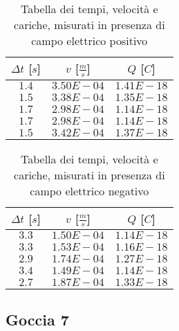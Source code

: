 \documentclass{article}
\begin{document}
\begin{multicols}{2}

\begin{table}[H]
	\centering
	\begin{tabular}{| c | c | c |}
		\hline
		$\Delta t$ [$s$] & $v$ [$\frac ms$] & $Q$ [$C$] \\
		\hline
		$1.4$ & $3.50E-04$ & $1.41E-18$ \\
		$1.5$ & $3.38E-04$ & $1.35E-18$ \\
		$1.7$ & $2.98E-04$ & $1.14E-18$ \\
		$1.7$ & $2.98E-04$ & $1.14E-18$ \\
		$1.5$ & $3.42E-04$ & $1.37E-18$ \\
		\hline
	\end{tabular}
	\caption{Tabella dei tempi, velocità e cariche, misurati in presenza di campo elettrico positivo}
	\label{}
\end{table}

\columnbreak

\begin{table}[H]
	\centering
	\begin{tabular}{| c | c | c |}
		\hline
		$\Delta t$ [$s$] & $v$ [$\frac ms$] & $Q$ [$C$] \\
		\hline
		$3.3$ & $1.50E-04$ & $1.14E-18$ \\
		$3.3$ & $1.53E-04$ & $1.16E-18$ \\
		$2.9$ & $1.74E-04$ & $1.27E-18$ \\
		$3.4$ & $1.49E-04$ & $1.14E-18$ \\
		$2.7$ & $1.87E-04$ & $1.33E-18$ \\
		\hline		
	\end{tabular}
	\caption{Tabella dei tempi, velocità e cariche, misurati in presenza di campo elettrico negativo}
	\label{}
\end{table}
	
\end{multicols}

\subsection{Goccia 7}
\end{document}
